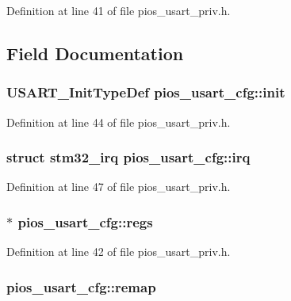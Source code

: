 Definition at line 41 of file pios\-\_\-usart\-\_\-priv.\-h.



\subsection{Field Documentation}
\hypertarget{structpios__usart__cfg_a20bd842c61ef010b8bfcf2cc42c19d1a}{
\subsubsection[{init}]{\setlength{\rightskip}{0pt plus 5cm}U\-S\-A\-R\-T\-\_\-\-Init\-Type\-Def pios\-\_\-usart\-\_\-cfg\-::init}}\label{structpios__usart__cfg_a20bd842c61ef010b8bfcf2cc42c19d1a}


Definition at line 44 of file pios\-\_\-usart\-\_\-priv.\-h.

\hypertarget{structpios__usart__cfg_aa2e41bd55618914f579729a722e2133e}{
\subsubsection[{irq}]{\setlength{\rightskip}{0pt plus 5cm}struct {\bf stm32\-\_\-irq} pios\-\_\-usart\-\_\-cfg\-::irq}}\label{structpios__usart__cfg_aa2e41bd55618914f579729a722e2133e}


Definition at line 47 of file pios\-\_\-usart\-\_\-priv.\-h.

\hypertarget{structpios__usart__cfg_a28b475a517c9d2fee0ab1a87d3c6ca67}{
\subsubsection[{regs}]{$\ast$ pios\-\_\-usart\-\_\-cfg\-::regs}}\label{structpios__usart__cfg_a28b475a517c9d2fee0ab1a87d3c6ca67}


Definition at line 42 of file pios\-\_\-usart\-\_\-priv.\-h.

\hypertarget{structpios__usart__cfg_a811f7d8ba9be86fdade5aedee961ebb2}{
\subsubsection[{remap}]{ pios\-\_\-usart\-\_\-cfg\-::remap}}\label{structpios__usart__cfg_a811f7d8ba9be86fdade5aedee961ebb2}


